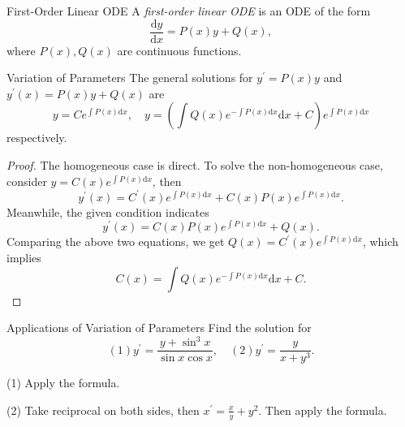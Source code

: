 \begin{definition}{First-Order Linear ODE}{}
  A \emph{first-order linear ODE} is an ODE of the form
  \begin{equation}
    \frac{\mathrm{d} y}{\mathrm{d} x} = P(x) y + Q(x),
  \end{equation}
  where $P(x), Q(x)$ are continuous functions.
\end{definition}

\begin{proposition}{Variation of Parameters}{}
  The general solutions for $y^{\prime} = P(x)y$ and $y^{\prime}(x) = P(x)y + Q(x)$ are
  \begin{equation}
    y = C e^{\int P(x)\mathrm{d} x}, \quad
    y = \left( \int Q(x) e^{-\int P(x)\mathrm{d} x}\mathrm{d} x + C \right) e^{\int P(x)\mathrm{d} x}
  \end{equation}
  respectively.
\end{proposition}

\begin{proof}
  The homogeneous case is direct. To solve the non-homogeneous case,
  consider $y = C(x)e^{\int P(x) \mathrm{d} x}$, then
  \begin{equation}
    y^{\prime}(x) = C^{\prime}(x) e^{\int P(x)\mathrm{d} x} + C(x) P(x) e^{\int P(x)\mathrm{d} x}.
  \end{equation}
  Meanwhile, the given condition indicates
  \begin{equation}
    y^{\prime}(x) = C(x)P(x)e^{\int P(x)\mathrm{d} x} + Q(x).
  \end{equation}
  Comparing the above two equations, we get $Q(x) = C^{\prime}(x) e^{\int P(x)\mathrm{d} x}$,
  which implies
  \begin{equation}
    C(x) = \int Q(x) e^{-\int P(x)\mathrm{d} x} \mathrm{d} x + C.
  \end{equation}
\end{proof}

\begin{example}{Applications of Variation of Parameters}{}
  Find the solution for
  \begin{equation}
    (1) y^{\prime} = \frac{y + \sin^3 x}{\sin x \cos x}, \quad
    (2) y^{\prime} = \frac{y}{x + y^3}.
  \end{equation}
\end{example}

\begin{solution}
  (1) Apply the formula.

  (2) Take reciprocal on both sides, then $x^{\prime} = \frac{x}{y} + y^2$. Then apply the formula.
\end{solution}

